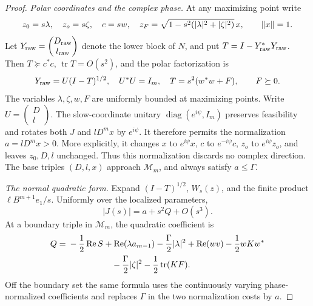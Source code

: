 \begin{proof}
\emph{Polar coordinates and the complex phase.}
At any maximizing point write
\[
 z_0=s\lambda,\quad z_o=s\zeta,\quad c=sw,\quad
 z_F=\sqrt{1-s^2(|\lambda|^2+|\zeta|^2)}\,x,\qquad \left\lVert x\right\rVert=1.
\]
Let $Y_{\rm raw}=\begin{pmatrix}D_{\rm raw}\\l_{\rm raw}\end{pmatrix}$
denote the lower block of $N$, and put
$T=I-Y_{\rm raw}^*Y_{\rm raw}$.  Then
$T\succeq c^*c$, $\operatorname{tr}T=O(s^2)$, and the polar
factorization is
\begin{equation}
 Y_{\rm raw}=U(I-T)^{1/2},\quad U^*U=I_m,\quad
 T=s^2(w^*w+F),\qquad F\succeq0.
 \label{I:R:eq:normal-polar}
\end{equation}
The variables $\lambda,\zeta,w,F$ are uniformly bounded at maximizing
points.  Write $U=\begin{pmatrix}D\\l\end{pmatrix}$.  The slow-coordinate
unitary $\operatorname{diag}(e^{i\psi},I_m)$ preserves feasibility and
rotates both $J$ and $lD^mx$ by $e^{i\psi}$.  It therefore permits the
normalization $a=lD^mx>0$.  More explicitly, it changes
$x$ to $e^{i\psi}x$, $c$ to $e^{-i\psi}c$, $z_o$ to
$e^{i\psi}z_o$, and leaves $z_0,D,l$ unchanged.  Thus this normalization
discards no complex direction.  The base triples $(D,l,x)$ approach
$\mathcal M_m$, and always satisfy $a\le\Gamma$.

\emph{The normal quadratic form.}
Expand $(I-T)^{1/2}$, $W_s(z)$, and the finite product $\ell B^{m+1}e_1/s$.
Uniformly over the localized parameters,
\begin{equation}
 |J(s)|=a+s^2Q+O(s^3).
 \label{I:R:eq:J-normal-expansion}
\end{equation}
At a boundary triple in $\mathcal M_m$, the quadratic coefficient is
\begin{align}
 Q={}&-\frac12\operatorname{Re}S
   +\operatorname{Re}(\lambda a_{m-1})-\frac\Gamma2|\lambda|^2
   +\operatorname{Re}(wv)-\frac12wKw^*\nonumber\\
   &\hspace{18mm}-\frac\Gamma2|\zeta|^2
                       -\frac12\operatorname{tr}(KF).
 \label{I:R:eq:normal-quadratic-Q}
\end{align}
Off the boundary set the same formula uses the continuously varying
phase-normalized coefficients and replaces $\Gamma$ in the two
normalization costs by $a$.


\end{proof}
